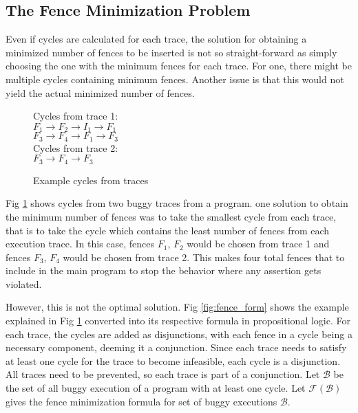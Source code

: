 \subsection{The Fence Minimization Problem} \label{sec:fence-min}
\par
Even if cycles are calculated for each trace, the solution for obtaining 
a minimized number of fences to be inserted is not so straight-forward 
as simply choosing the one with the minimum fences for each trace. 
For one, there might be multiple cycles containing minimum fences. 
Another issue is that this would not yield the actual minimized 
number of fences. 

\begin{figure}
\begin{center}
	Cycles from trace 1:\\
	\textit{$F_1 \rightarrow F_2 \rightarrow I_1 \rightarrow F_1$}\\
	\textit{$F_3 \rightarrow F_4 \rightarrow F_1 \rightarrow F_3$}\\
	Cycles from trace 2:\\
	\textit{$F_3 \rightarrow F_4 \rightarrow F_3$}
	\caption{Example cycles from traces}
	\label{fig:fence_min}
\end{center}
\end{figure}

Fig \ref{fig:fence_min} shows cycles from two buggy traces from 
a program. 
one solution to obtain the minimum number of fences was 
to take the smallest cycle from each trace, that is to take the 
cycle which contains the least number of fences from each execution 
trace. In this case, fences \textit{$F_1$}, \textit{$F_2$} 
would be chosen from trace 1 and fences \textit{$F_3$}, \textit{$F_4$} 
would be chosen from trace 2. This makes four total fences that 
to include in the main program to stop the behavior where 
any assertion gets violated.

\par
However, this is not the optimal solution. Fig \ref{fig:fence_form} 
shows the example explained in Fig \ref{fig:fence_min} converted 
into its respective formula in propositional logic. For each trace, 
the cycles are added as disjunctions, with each fence in a cycle 
being a necessary component, deeming it a conjunction. Since each 
trace needs to satisfy at least one cycle for the trace to become 
infeasible, each cycle is a disjunction. All traces need to be 
prevented, so each trace is part of a conjunction. Let 
$ \mathcal{B} $ be the set of all buggy execution of a program with 
at least one cycle. Let $ \mathcal{F}(\mathcal{B}) $ gives the 
fence minimization formula for set of buggy executions $ \mathcal{B} $.

